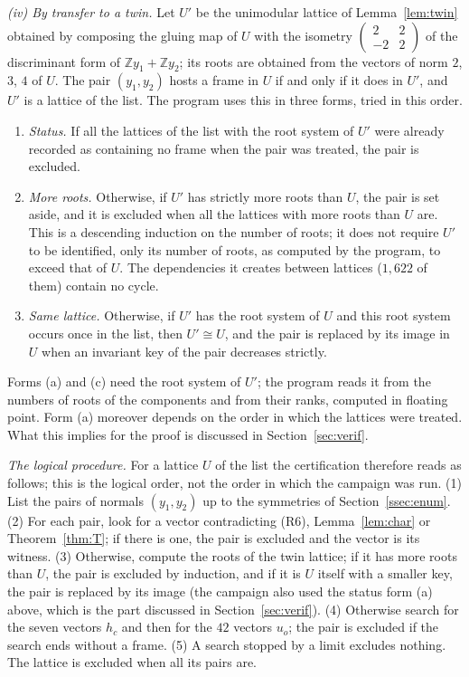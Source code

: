 \documentclass[11pt]{amsart}
\theoremstyle{definition}
\theoremstyle{remark}
\newcommand{\Z}{\mathbb{Z}}
\begin{document}
\smallskip\noindent\emph{(iv) By transfer to a twin.} Let $U'$ be the unimodular lattice of Lemma~\ref{lem:twin} obtained by
composing the gluing map of $U$ with the isometry $\left(\begin{smallmatrix}2&2\\-2&2\end{smallmatrix}\right)$ of the
discriminant form of $\Z y_1+\Z y_2$; its roots are obtained from the vectors of norm $2$, $3$, $4$ of $U$. The pair
$(y_1,y_2)$ hosts a frame in $U$ if and only if it does in $U'$, and $U'$ is a lattice of the list. The program uses this in
three forms, tried in this order.
\begin{enumerate}[label=\textup{(\alph*)},leftmargin=2.4em]
\item \emph{Status.} If all the lattices of the list with the root system of $U'$ were already recorded as containing no
frame when the pair was treated, the pair is excluded.
\item \emph{More roots.} Otherwise, if $U'$ has strictly more roots than $U$, the pair is set aside, and it is excluded when
all the lattices with more roots than $U$ are. This is a descending induction on the number of roots; it does not require
$U'$ to be identified, only its number of roots, as computed by the program, to exceed that of $U$. The dependencies it
creates between lattices ($1{,}622$ of them) contain no cycle.
\item \emph{Same lattice.} Otherwise, if $U'$ has the root system of $U$ and this root system occurs once in the list, then
$U'\cong U$, and the pair is replaced by its image in $U$ when an invariant key of the pair decreases strictly.
\end{enumerate}
Forms (a) and (c) need the root system of $U'$; the program reads it from the numbers of roots of the components and from
their ranks, computed in floating point. Form (a) moreover depends on the order in which the lattices were treated. What
this implies for the proof is discussed in Section~\ref{sec:verif}.

\medskip
\smallskip\noindent\emph{The logical procedure.} For a lattice $U$ of the list the certification therefore reads as
follows; this is the logical order, not the order in which the campaign was run. (1) List the pairs of normals
$(y_1,y_2)$ up to the symmetries of Section~\ref{ssec:enum}. (2) For each pair, look for a vector contradicting (R6),
Lemma~\ref{lem:char} or Theorem~\ref{thm:T}; if there is one, the pair is excluded and the vector is its witness. (3)
Otherwise, compute the roots of the twin lattice; if it has more roots than $U$, the pair is excluded by induction, and if
it is $U$ itself with a smaller key, the pair is replaced by its image (the campaign also used the status form (a) above,
which is the part discussed in Section~\ref{sec:verif}). (4) Otherwise search for the seven vectors $h_c$ and
then for the $42$ vectors $u_o$; the pair is excluded if the search ends without a frame. (5) A search stopped by a limit
excludes nothing. The lattice is excluded when all its pairs are.
\end{document}
